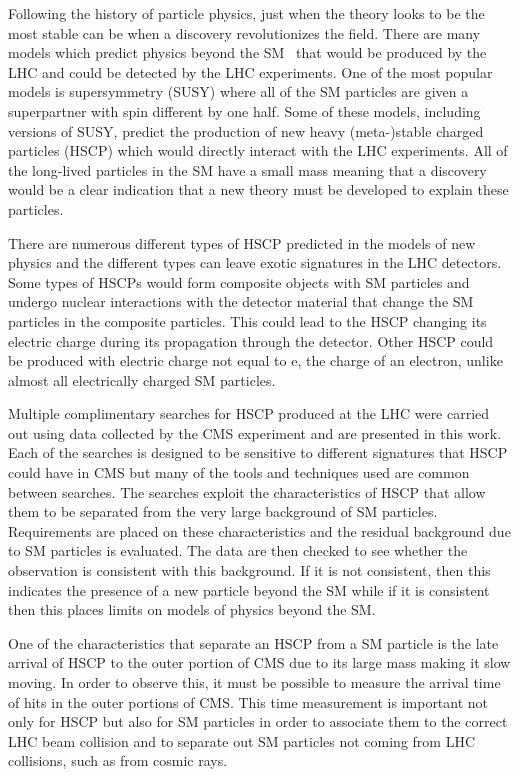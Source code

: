 Following the history of particle physics, just when the theory looks to be the most stable can be when a discovery revolutionizes the field.
There are many models which predict physics beyond the SM~\cite{Martin:1997ns, Tata:1997uf} 
that would be produced by the LHC and could be detected by the LHC experiments.
One of the most popular models is supersymmetry (SUSY) where all of the SM particles are given a superpartner with spin different by one half.
Some of these models, including versions of SUSY, predict the production of new heavy (meta-)stable charged particles (HSCP) 
which would directly interact with the LHC experiments. All of the long-lived particles in the SM have a small mass meaning that a discovery
would be a clear indication that a new theory must be developed to explain these particles.

There are numerous different types of HSCP predicted in the models of new physics and the different types can leave exotic signatures in the LHC detectors.
Some types of HSCPs would form composite objects with SM particles and undergo nuclear interactions with the detector material
that change the SM particles in the composite particles. This could lead to the HSCP changing its electric charge during its propagation through the detector.
Other HSCP could be produced with electric charge not equal to e, the charge of an electron, unlike almost all electrically charged SM particles.

Multiple complimentary searches for HSCP produced at the LHC were carried out using data collected by the CMS experiment and are presented in this work.
Each of the searches is designed to be sensitive to different signatures that HSCP could have in CMS but many of the tools and techniques used are
common between searches. The searches exploit the characteristics of HSCP that allow them to be separated from the very large background of SM particles.
Requirements are placed on these characteristics and the residual background due to SM particles is evaluated. The data are then checked to see whether
the observation is consistent with this background. If it is not consistent, then this indicates the presence of a new particle beyond the SM while if it
is consistent then this places limits on models of physics beyond the SM.

One of the characteristics that separate an HSCP from a SM particle is the late arrival of HSCP to the outer portion of CMS due to its large mass making it slow moving.
In order to observe this, it must be possible to measure the arrival time of hits in the outer portions of CMS. This time measurement is important not only
for HSCP but also for SM particles in order to associate them to the correct LHC beam collision and to separate out SM particles not coming from
LHC collisions, such as from cosmic rays.

